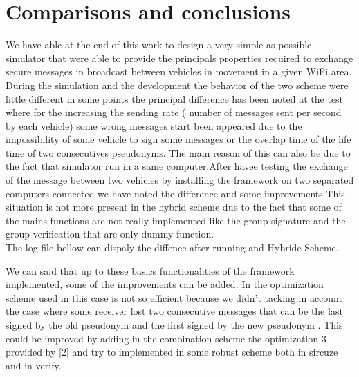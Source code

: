 \section{Comparisons and conclusions}
We have able at the end of this work to design a very simple as possible simulator that were able to provide the principals properties required to exchange secure messages in broadcast between vehicles in movement in a given WiFi area.    
During the simulation and the development the behavior of the two scheme were little different in some points the principal difference has been noted at the test where for the \baseline increasing the sending rate ( number of messages sent per  second by each vehicle) some wrong messages start been appeared due to the impossibility of some vehicle to sign some messages or the overlap time of the life time of two consecutives pseudonyms. The main reason of this can also be due to the fact that simulator run in a same computer.After havee testing the exchange of the message between two vehicles by installing the framework on two separated computers connected we have noted the difference and some improvements
This situation is not more present in the hybrid scheme due to the fact that some of the mains functions are not really implemented like the group signature and the group verification that are only dummy function.\\

The log file bellow can dispaly the diffence after running \baseline and Hybride Scheme.

We can said that up to these basics functionalities of the framework implemented, some of the improvements can be added.  In the optimization scheme used in this case is not so efficient because we didn't tacking in account the case where some receiver lost two consecutive messages that can be the last signed by the old pseudonym and the first signed by the  new pseudonym . This could be improved by adding in the combination scheme the optimization 3 provided by [2] and try to implemented in some robust scheme both in sircuze and in verify.\\
